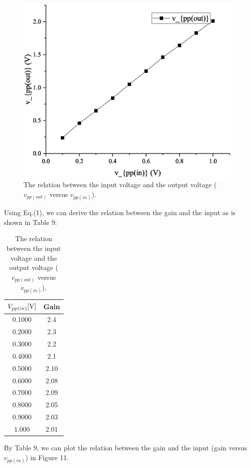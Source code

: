 \documentclass[a4paper]{report}
\begin{document}
	\begin{figure}[H]
		\centering
		\includegraphics[width=1\linewidth]{10.eps}
		\caption{The relation between the input voltage and the output voltage ($v_{pp(out)}$ versus $v_{pp(in)}$).}
	\end{figure}
	Using Eq.(1), we can derive the relation between the gain and the input as is shown in Table 9:
	\begin{table}[H]
		\centering
		\begin{tabular}{|c|c|}
			\hline
			$V_{pp(in)}[\rm{V}]$&Gain\\
			\hline
			0.1000&2.4\\
			\hline
			0.2000&2.3\\
			\hline
			0.3000&2.2\\
			\hline
			0.4000&2.1\\
			\hline
			0.5000&2.10\\
			\hline
			0.6000&2.08\\
			\hline
			0.7000&2.09\\
			\hline
			0.8000&2.05\\
			\hline
			0.9000&2.03\\
			\hline
			1.000&2.01\\
			\hline
		\end{tabular}
		\caption{The relation between the input voltage and the output voltage ($v_{pp(out)}$ versus $v_{pp(in)}$).}
	\end{table}
	By Table 9, we can plot the relation between the gain and the input (gain versus $v_{pp(in)}$) in Figure 11.
\end{document}
